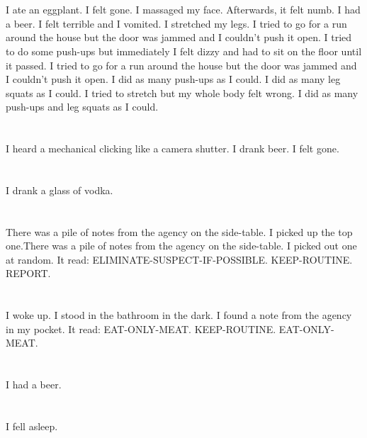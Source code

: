 \documentclass{article}
\begin{document}
    \section{}
    I ate an eggplant. I felt gone. I massaged my face. Afterwards, it felt numb. I had a beer. I felt terrible and I vomited.  I stretched my legs.  I tried to go for a run around the house but the door was jammed and I couldn't push it open.  I tried to do some push-ups but immediately I felt dizzy and had to sit on the floor until it passed.  I tried to go for a run around the house but the door was jammed and I couldn't push it open.   I did as many push-ups as I could.  I did as many leg squats as I could.  I tried to stretch but my whole body felt wrong.  I did as many push-ups and leg squats as I could.  
    \newpage
    
    \section{}
    I heard a mechanical clicking like a camera shutter. I drank beer. I felt gone.  
    \newpage
    
    \section{}
    I drank a glass of vodka.  
    \newpage
    
    \section{}
    There was a pile of notes from the agency on the side-table. I picked up the top one.There was a pile of notes from the agency on the side-table. I picked out one at random. It read: ELIMINATE-SUSPECT-IF-POSSIBLE. KEEP-ROUTINE. REPORT.  
    \newpage
    
    \section{}
    I woke up. I stood in the bathroom in the dark. I found a note from the agency in my pocket. It read: EAT-ONLY-MEAT. KEEP-ROUTINE. EAT-ONLY-MEAT.  
    \newpage
    
    \section{}
    I had a beer.  
    \newpage
    
    \section{}
    I fell asleep.\\\\ 
    \newpage
    
\end{document}
